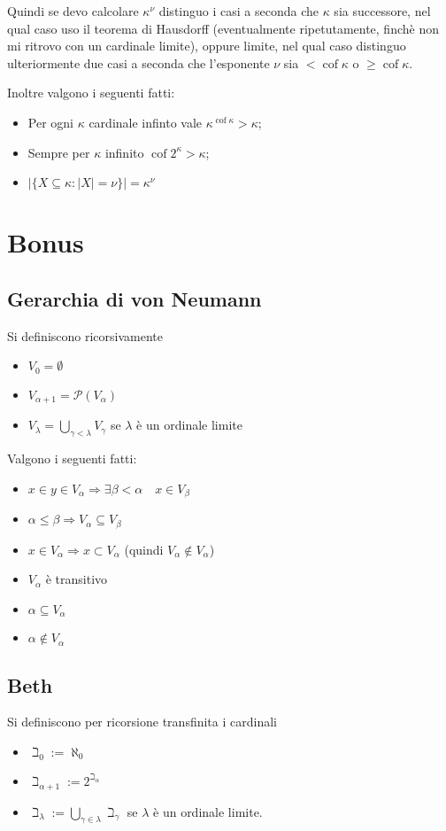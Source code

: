 \documentclass[a4paper,10pt,oneside]{article}
\DeclareMathOperator{\cof}{cof}
\theoremstyle{plain}
\theoremstyle{definition}
\theoremstyle{remark}
\begin{document}
Quindi se devo calcolare $\kappa^\nu$ distinguo i casi a seconda che $\kappa$ sia successore, nel qual caso uso il teorema di Hausdorff (eventualmente ripetutamente, finchè non mi ritrovo con un cardinale limite), oppure limite, nel qual caso distinguo ulteriormente due casi a seconda che l'esponente $\nu$ sia $<\cof \kappa$ o $\ge \cof \kappa$.

Inoltre valgono i seguenti fatti: 

\begin{itemize}
\item Per ogni $\kappa$ cardinale infinto vale $\kappa^{\cof\kappa}>\kappa$;
\item Sempre per $\kappa$ infinito $\cof 2^\kappa>\kappa$;

\item $|\{X\subseteq \kappa: |X|=\nu\}|=\kappa^\nu$
\end{itemize}

\section{Bonus}
\subsection{Gerarchia di von Neumann}
Si definiscono ricorsivamente
\begin{itemize}
   \item $V_0 = \emptyset$
   \item $V_{\alpha +1}=\mathcal{P}(V_\alpha)$
   \item $V_{\lambda}=\bigcup_{\gamma<\lambda}V_\gamma$ se $\lambda$ è un ordinale limite
\end{itemize}
Valgono i seguenti fatti:
\begin{itemize}
  \item $x\in y\in V_\alpha \Rightarrow \exists \beta <\alpha \quad x \in V_\beta$
  \item $\alpha\le\beta \Rightarrow V_\alpha\subseteq V_\beta$
  \item $x\in V_\alpha \Rightarrow x \subset V_\alpha$ (quindi $V_\alpha \notin V_\alpha$)
  \item $V_\alpha$ è transitivo
  \item $\alpha \subseteq V_\alpha$
  \item $\alpha \notin V_\alpha$
\end{itemize}

\subsection{Beth}
Si definiscono per ricorsione transfinita i cardinali
\begin{itemize}
 \item $\beth_0:=\aleph_0$
 \item $\beth_{\alpha+1}:=2^{\beth_\alpha}$
 \item $\beth_\lambda:=\bigcup_{\gamma\in\lambda}\beth_\gamma$ se $\lambda$ è un ordinale limite.
\end{itemize}
\end{document}
